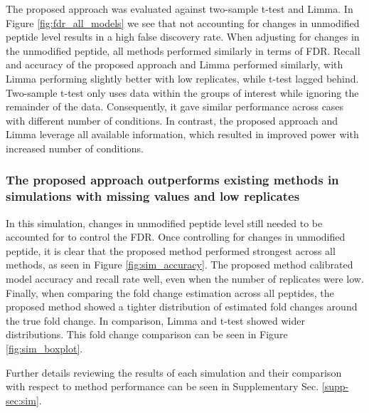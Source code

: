 \documentclass[mcp]{article}
\numberwithin{table}{section}
\begin{document}
The proposed approach was evaluated against two-sample t-test and Limma. 
In Figure \ref{fig:fdr_all_models} we see that not accounting for changes in unmodified peptide level results in a high false discovery rate. When adjusting for changes in the unmodified peptide, all methods performed similarly in terms of FDR. Recall and accuracy of the proposed approach and Limma performed similarly, with Limma performing slightly better with low replicates, while t-test lagged behind. Two-sample t-test only uses data within the groups of interest while ignoring the remainder of the data. Consequently, it gave similar performance across cases with different number of conditions. In contrast, the proposed approach and Limma leverage all available information, which resulted in improved power with increased number of conditions.

\subsubsection*{The proposed approach outperforms existing methods in simulations with missing values and low replicates}

In this simulation, changes in unmodified peptide level still needed to be accounted for to control the FDR. Once controlling for changes in unmodified peptide, it is clear that the proposed method performed strongest across all methods, as seen in Figure \ref{fig:sim_accuracy}. The proposed method calibrated model accuracy and recall rate well, even when the number of replicates were low. Finally, when comparing the fold change estimation across all peptides, the proposed method showed a tighter distribution of estimated fold changes around the true fold change. In comparison, Limma and t-test showed wider distributions. This fold change comparison can be seen in Figure \ref{fig:sim_boxplot}. 

Further details reviewing the results of each simulation and their comparison with respect to method performance can be seen in Supplementary Sec. \ref{supp-sec:sim}. 

\end{document}
